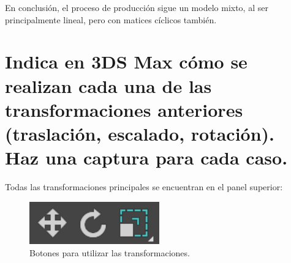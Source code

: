 \documentclass{article}
\begin{document}
\bigskip

En conclusión, el proceso de producción sigue un modelo mixto, al ser principalmente lineal, pero con matices cíclicos también.

\section{Indica en 3DS Max cómo se realizan cada una de las transformaciones anteriores (traslación, escalado, rotación). Haz una captura para cada caso.}

Todas las transformaciones principales se encuentran en el panel superior:

\begin{figure}[H]
    \centering
    \includegraphics[width=0.5\textwidth]{imagenes/tools.png}
    \caption{Botones para utilizar las transformaciones.}
 \end{figure}
\end{document}
